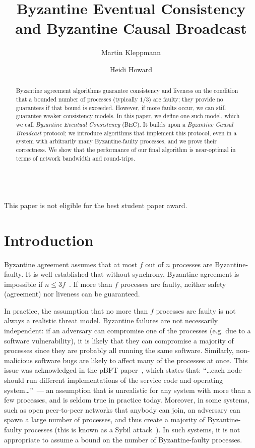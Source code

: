 \documentclass[a4paper,anonymous,USenglish]{lipics-v2019}
\title{Byzantine Eventual Consistency and Byzantine Causal Broadcast}
\author{Martin Kleppmann}{University of Cambridge}{mk428@cst.cam.ac.uk}{https://orcid.org/0000-0001-7252-6958}{This work was supported by a Leverhulme Trust Early Career Fellowship and by the Isaac Newton Trust.}
\author{Heidi Howard}{University of Cambridge}{hh360@cst.cam.ac.uk}{https://orcid.org/0000-0001-5256-7664}{TODO add funding details}
\begin{document}
\maketitle
\begin{abstract}
    Byzantine agreement algorithms guarantee consistency and liveness on the condition that a bounded number of processes (typically $1/3$) are faulty; they provide no guarantees if that bound is exceeded.
    However, if more faults occur, we can still guarantee weaker consistency models. 
    In this paper, we define one such model, which we call \emph{Byzantine Eventual Consistency} (BEC).
    It builds upon a \emph{Byzantine Causal Broadcast} protocol; we introduce algorithms that implement this protocol, even in a system with arbitrarily many Byzantine-faulty processes, and we prove their correctness.
    We show that the performance of our final algorithm is near-optimal in terms of network bandwidth and round-trips.
\end{abstract}
\maketitle\\[20pt]
This paper is not eligible for the best student paper award.
\newpage

\section{Introduction}

Byzantine agreement assumes that at most $f$ out of $n$ processes are Byzantine-faulty.
It is well established that without synchrony, Byzantine agreement is impossible if $n\leq3f$~\cite{Dwork:1988,Lamport:1982}.
If more than $f$ processes are faulty, neither safety (agreement) nor liveness can be guaranteed.

In practice, the assumption that no more than $f$ processes are faulty is not always a realistic threat model.
Byzantine failures are not necessarily independent: if an adversary can compromise one of the processes (e.g. due to a software vulnerability), it is likely that they can compromise a majority of processes since they are probably all running the same software. 
Similarly, non-malicious software bugs are likely to affect many of the processes at once.
This issue was acknowledged in the pBFT paper~\cite{Castro:1999}, which states that: ``{\dots}each node should run different implementations of the service code and operating system{\dots}''~--- an assumption that is unrealistic for any system with more than a few processes, and is seldom true in practice today.
Moreover, in some systems, such as open peer-to-peer networks that anybody can join, an adversary can spawn a large number of processes, and thus create a majority of Byzantine-faulty processes (this is known as a Sybil attack~\cite{Douceur:2002}).
In such systems, it is not appropriate to assume a bound on the number of Byzantine-faulty processes.
\end{document}
